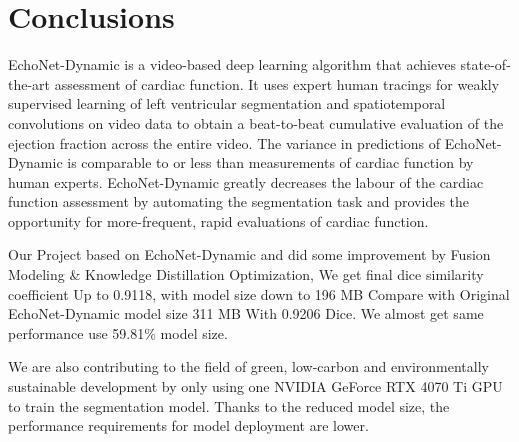 \vfill
\section{Conclusions}

EchoNet-Dynamic is a video-based deep learning algorithm that achieves state-of-the-art assessment of cardiac function. It uses expert human tracings for weakly supervised learning of left ventricular segmentation and spatiotemporal convolutions on video data to obtain a beat-to-beat cumulative evaluation of the ejection fraction across the entire video. The variance in predictions of EchoNet-Dynamic is comparable to or less than measurements of cardiac function by human experts. EchoNet-Dynamic greatly decreases the labour of the cardiac function assessment by automating the segmentation task and provides the opportunity for more-frequent, rapid evaluations of cardiac function.

Our Project based on EchoNet-Dynamic and did some improvement by Fusion Modeling \& Knowledge Distillation Optimization, We get final dice similarity coefficient Up to 0.9118, with model size down to 196 MB Compare with Original EchoNet-Dynamic model size  311 MB With 0.9206 Dice. We almost get same performance use 59.81\% model size.

We are also contributing to the field of green, low-carbon and environmentally sustainable development by only using one NVIDIA GeForce RTX 4070 Ti GPU to train the segmentation model. Thanks to the reduced model size, the performance requirements for model deployment are lower. 

